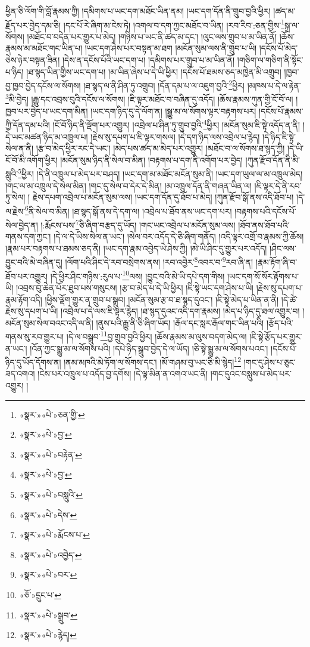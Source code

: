 ཕྱིན་ཅི་ལོག་གི་བློ་རྣམས་ཀྱི། །དམིགས་པ་ཡང་དག་མཐོང་ཡིན་ནམ། །ཡང་དག་དོན་ནི་གྲུབ་བྱའི་ཕྱིར། །ཚད་མ་རྗོད་པར་བྱེད་དམ་ཅི། །དང་པོ་རེ་ཞིག་མ་ངེས་ཏེ། །འགལ་བ་དག་ཀྱང་མཐོང་བ་ཡིན། །རབ་རིབ་:ཅན་གྱིས་\footnote{«སྣར་»«པེ་»ཅན་གྱི་}སྐྲ་ལ་སོགས། །མཐོང་བ་བདེན་པར་གྱུར་པ་མེད། །གཉིས་པ་ཡང་ནི་ཚད་མ་དང་། །ལུང་ལས་གྲུབ་པ་མ་ཡིན་ནོ། །ཆོས་རྣམས་མ་མཐོང་གང་ཡིན་པ། །ཡང་དག་ཤེས་པར་བསྟན་མ་ཐག །མངོན་སུམ་ལས་ནི་གྲུབ་པ་ཡི། །དངོས་པོ་མེད་ཅེས་ཉེར་བསྟན་ཟིན། །དེས་ན་དངོས་པོའི་ཡང་དག་པ། །དམིགས་པར་གྲུབ་པ་མ་ཡིན་ནོ། །གཅིག་ལ་གཅིག་ནི་སྟོང་པ་ཉིད། །ཐ་སྙད་ཡིན་གྱིས་ཡང་དག་པ། །མ་ཡིན་ཞེས་པ་དེ་ཡི་ཕྱིར། །དངོས་པོ་ཐམས་ཅད་མཁྱེན་མི་འགྲུབ། །ཁྱབ་བྱ་ཁྱབ་བྱེད་དངོས་ལ་སོགས། །ཐ་སྙད་ལ་ནི་ཤིན་ཏུ་འགྲུབ། །དོན་དམ་པ་ལ་འཇུག་བྱའི་\footnote{«སྣར་»«པེ་»བྱ་}ཕྱིར། །མཁས་པ་དེ་ལ་རྟེན་\footnote{«སྣར་»«པེ་»བརྟེན་}མི་བྱེད། །རྒྱུ་དང་འབྲས་བུའི་དངོས་ལ་སོགས། །ཇི་ལྟར་མཐོང་བ་བཞིན་དུ་འདོད། །ཆོས་རྣམས་ཀུན་གྱི་ངོ་བོ་ལ། །ཁྱབ་པར་བྱེད་པ་ཡང་དག་མིན། །ཡང་དག་ཉིད་དུ་དེ་ལོག་ན། །སྒྱུ་མ་ལ་སོགས་ལྟར་བརྟགས་པར། །དངོས་པོ་རྣམས་ཀྱི་དོན་དམ་པའི། །ངོ་བོ་ཉིད་ནི་ལྡོག་པར་འགྱུར། །འབྲེལ་པ་ཤིན་ཏུ་གྲུབ་བྱའི་\footnote{«སྣར་»«པེ་»བྱ་}ཕྱིར། །མངོན་སུམ་ཇི་སྟེ་འདོད་ན་ནི། །དེ་ཡང་མཚན་ཉིད་མ་འཁྲུལ་པ། །རྗེས་སུ་དཔག་པ་ཇི་ལྟར་གསལ། །དེ་དག་ཉིད་ལས་འབྲེལ་པ་རྙེད། །དེ་ཉིད་ཇི་སྟེ་སེལ་ན་ནི། །རྩ་བ་མེད་ཕྱིར་རང་དེ་ཡང་། །མེད་པས་ཚད་མ་མེད་པར་འགྱུར། །མཐོང་བ་ལ་སོགས་ཐ་སྙད་ཀྱི། །དེ་ཡི་ངོ་བོ་མི་འགོག་ཕྱིར། །མངོན་སུམ་ཉིད་ནི་སེལ་བ་མིན། །བརྟགས་པ་དག་ནི་འགོག་པར་བྱེད། །ཀུན་རྫོབ་དོན་ནི་མི་སླུའི་\footnote{«སྣར་»«པེ་»བསླུའི་}ཕྱིར། །དེ་ནི་འཁྲུལ་པ་མེད་པར་བཤད། །ཡང་དག་མ་མཐོང་མངོན་སུམ་ནི། །ཡང་དག་ཡུལ་ལ་མ་འཁྲུལ་མེད། །གང་ལ་མ་འཁྲུལ་དེ་སེལ་མིན། །གང་དུ་སེལ་བ་དེར་དེ་མིན། །མ་འཁྲུལ་དོན་ནི་གཞན་ཡིན་ལ། །ཇི་ལྟར་དེ་ནི་རབ་ཏུ་སེལ། །
རྗེས་དཔག་འབྲེལ་པ་མངོན་སུམ་ལས། །ཡང་དག་དོན་དུ་ཐོབ་པ་མེད། །ཀུན་རྫོབ་སྒོ་ནས་འདི་ཐོབ་པ། །དེ་ལ་རྗེས་\footnote{«སྣར་»«པེ་»དེས་}ནི་སེལ་བ་མིན། །ཐ་སྙད་སྒོ་ནས་དེ་དག་ལ། །འབྲེལ་པ་ཐོབ་ནས་ཡང་དག་པར། །བརྟགས་པའི་དངོས་པོ་སེལ་བྱེད་ན། །:རྨོངས་པས་\footnote{«སྣར་»«པེ་»རྨོངས་པ་}ཅི་ཞིག་བརྩད་དུ་ཡོད། །གང་ཡང་འབྲེལ་པ་མངོན་སུམ་ལས། །ཐོབ་ནས་ཐོབ་པའི་གནས་དག་ཀྱང་། །དེ་ལ་དེ་ཡིས་སེལ་ན་ཡང་། །སེལ་བར་འདོད་དེ་ཅི་ཞིག་གནོད། །འདི་ལྟར་འགྲོ་བ་རྣམས་ཀྱི་ཆོས། །རྣམ་པར་བརྟགས་པ་ཐམས་ཅད་ནི། །ཡང་དག་རྣམ་འབྱེད་ཡེ་ཤེས་ཀྱི། །མེ་ཡི་ཤིང་དུ་གྱུར་པར་འདོད། །ཤིང་ལས་བྱུང་བའི་མེ་བཞིན་དུ། །ལོག་པའི་ཤིང་དེ་རབ་བསྲེགས་ནས། །རབ་འབྱེར་\footnote{«སྣར་»«པེ་»འབྱེད་}འབར་བ་\footnote{«སྣར་»«པེ་»བར་}རབ་ཞི་ན། །རྣམ་རྟོག་ཞི་བ་ཐོབ་པར་འགྱུར། །དེ་ཕྱིར་ཤིང་གཉིས་:རུལ་པ་\footnote{«ཅོ་»དྲུང་པ་}ལས། །བྱུང་བའི་མེ་ཡི་དཔེ་དག་གིས། །ཡང་དག་སོ་སོར་རྟོགས་པ་ཡི། །འབྲས་བུ་ཆེན་པོར་ཐུབ་པས་གསུངས། །རྩ་བ་མེད་པ་དེ་ཡི་ཕྱིར། །ཇི་སྟེ་ཡང་དག་ཤེས་པ་ཡི། །རྗེས་སུ་དཔག་པ་རྣམ་རྟོག་འདི། །ཕྱིས་ལྡོག་གྱུར་ན་གྲུབ་པ་སྒྲུབ། །མངོན་སུམ་རྩ་བ་ཐ་སྙད་དུའང་། །ཇི་སྟེ་མེད་པ་ཡིན་ན་ནི། །དེ་ཚེ་རྗེས་སུ་དཔག་པ་ཡི། །འབྲེལ་པ་དེ་ལས་ཇི་ལྟར་རྙེད། །ཐ་སྙད་དུའང་འདི་དག་རྣམས། །མེད་པ་ཉིད་དུ་ཐལ་འགྱུར་བ། །མངོན་སུམ་སེལ་བའང་འདི་ལ་ནི། །ནུས་པའི་རྒྱུ་ནི་ཅི་ཞིག་ཡོད། །རྒོལ་དང་སླར་རྒོལ་གང་ཡིན་པའི། །རྩོད་པའི་གནས་སུ་རབ་གྱུར་པ། །དེ་ལ་བསྒྲུབ་\footnote{«སྣར་»«པེ་»སྒྲུབ་}བྱ་གྲུབ་བྱའི་ཕྱིར། །ཆོས་རྣམས་མ་ལུས་བདག་མེད་ལ། །ཇི་སྟེ་རྩོད་པར་གྱུར་ན་ཡང་། །འོན་ཀྱང་སྒྱུ་མ་ལ་སོགས་པའི། །དཔེ་ཉིད་སྒྲུབ་བྱེད་དེ་ལ་ཡོད། །ཅི་སྟེ་སྒྱུ་མ་ལ་སོགས་པའང་། །དངོས་པོ་ཉིད་དུ་ཡོད་དོགས་ན། །ནམ་མཁའི་མེ་ཏོག་ལ་སོགས་དང་། །མོ་གཤམ་བུ་ཡང་ཅི་མི་སྙེད།\footnote{«སྣར་»«པེ་»རྙེད།} །གང་དུ་ཤེས་པ་ཅུང་ཟད་འགའ། །ངེས་པར་འཁྲུལ་པ་འདོད་བྱ་དགོས། །དེ་ལྟ་མིན་ན་འགའ་ཡང་ནི། །གང་དུའང་བསླུས་པ་མེད་པར་འགྱུར། །
